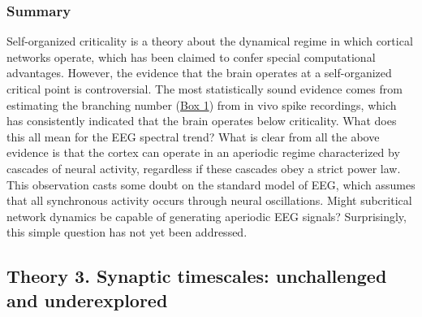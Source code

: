 \subsubsection{Summary}

Self-organized criticality is a theory about the dynamical regime in which cortical networks operate, which has been claimed to confer special computational advantages. However, the evidence that the brain operates at a self-organized critical point is controversial. The most statistically sound evidence comes from estimating the branching number (\hyperref[box:first]{Box 1}) from in vivo spike recordings, which has consistently indicated that the brain operates below criticality. What does this all mean for the EEG spectral trend? What is clear from all the above evidence is that the cortex can operate in an aperiodic regime characterized by cascades of neural activity, regardless if these cascades obey a strict power law. This observation casts some doubt on the standard model of EEG, which assumes that all synchronous activity occurs through neural oscillations. Might subcritical network dynamics be capable of generating aperiodic EEG signals? Surprisingly, this simple question has not yet been addressed.

\subsection{Theory 3. Synaptic timescales: unchallenged and underexplored} \label{sec:timescales}


